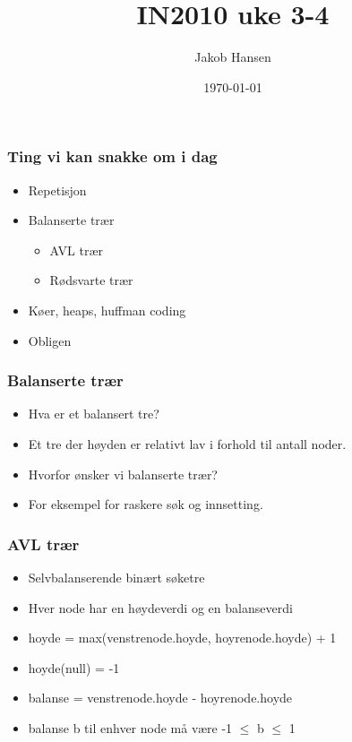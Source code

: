 \documentclass[norsk, handout]{beamer}
\title{IN2010 uke 3-4}
\author{Jakob Hansen}
\date{\today}
\begin{document}
	\frame{\titlepage}
    \begin{frame}
        \frametitle{Ting vi kan snakke om i dag}

        \begin{itemize}
            \item Repetisjon
            \item Balanserte trær
                \begin{itemize}
                    \item AVL trær
                    \item Rødsvarte trær
                \end{itemize}
			\item Køer, heaps, huffman coding
            \item Obligen
        \end{itemize}
    \end{frame}

    \begin{frame}
        \frametitle{Balanserte trær}
        \begin{itemize}
            \item Hva er et balansert tre?
                \pause
            \item Et tre der høyden er relativt lav i forhold til antall noder.
                \pause
            \item Hvorfor ønsker vi balanserte trær?
                \pause
            \item For eksempel for raskere søk og innsetting.
        \end{itemize}
    \end{frame}

    \begin{frame}
        \frametitle{AVL trær}
        \begin{itemize}
            \item Selvbalanserende binært søketre
            \item Hver node har en høydeverdi og en balanseverdi
            \item hoyde = max(venstrenode.hoyde, hoyrenode.hoyde) + 1
            \item hoyde(null) = -1
            \item balanse = venstrenode.hoyde - hoyrenode.hoyde
            \item balanse b til enhver node må være -1 $\leq$ b $\leq$ 1
        \end{itemize}
    \end{frame}
\end{document}
